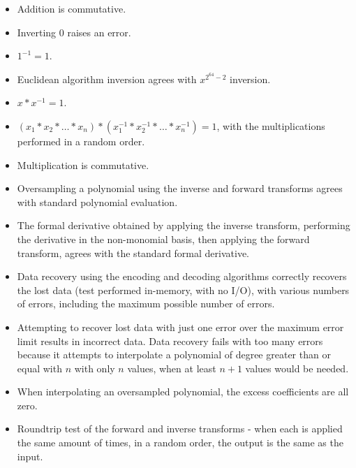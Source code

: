 \begin{itemize}
\item Addition is commutative.
\item Inverting 0 raises an error.
\item $1^{-1} = 1$.
\item Euclidean algorithm inversion agrees with $x^{2^{64} - 2}$ inversion.
\item $x * x^{-1} = 1$.
\item $(x_1 * x_2 * \ldots * x_n) * (x_1^{-1} * x_2^{-1} * \ldots * x_n^{-1}) = 1$, with the multiplications performed in a random order.
\item Multiplication is commutative.
\item Oversampling a polynomial using the inverse and forward transforms agrees with standard polynomial evaluation.
\item The formal derivative obtained by applying the inverse transform, performing the derivative in the non-monomial basis, then applying the forward transform, agrees with the standard formal derivative.
\item Data recovery using the encoding and decoding algorithms correctly recovers the lost data (test performed in-memory, with no I/O), with various numbers of errors, including the maximum possible number of errors.
\item Attempting to recover lost data with just one error over the maximum error limit results in incorrect data.
      Data recovery fails with too many errors because it attempts to interpolate a polynomial of degree greater than or equal with $n$ with only $n$ values, when at least $n + 1$ values would be needed.
\item When interpolating an oversampled polynomial, the excess coefficients are all zero.
\item Roundtrip test of the forward and inverse transforms - when each is applied the same amount of times, in a random order, the output is the same as the input.
\end{itemize}
